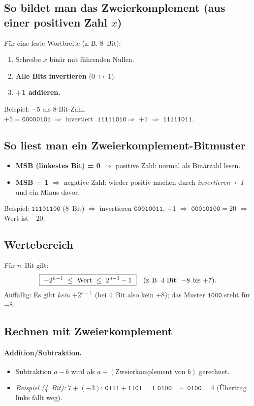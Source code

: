 \documentclass[12pt,a4paper]{book}
\begin{document}
\subsection{So bildet man das Zweierkomplement (aus einer positiven Zahl \(x\))}
Für eine feste Wortbreite (z.\,B. 8~Bit):
\begin{enumerate}
	\item Schreibe \(x\) binär mit führenden Nullen.
	\item \textbf{Alle Bits invertieren} (0\,\(\leftrightarrow\)\,1).
	\item \textbf{+1 addieren.}
\end{enumerate}
Beispiel: \(-5\) als 8-Bit-Zahl. \\
\(+5 = \texttt{00000101}\ \Rightarrow\) invertiert \(\texttt{11111010}\ \Rightarrow\) \(+1\) \(\Rightarrow\) \(\boxed{\texttt{11111011}}\).

\subsection*{So liest man ein Zweierkomplement-Bitmuster}
\begin{itemize}
	\item \textbf{MSB (linkestes Bit) = 0} \(\Rightarrow\) positive Zahl: normal als Binärzahl lesen.
	\item \textbf{MSB = 1} \(\Rightarrow\) negative Zahl: wieder positiv machen durch \emph{invertieren + 1} und ein Minus davor.
\end{itemize}
Beispiel: \(\texttt{11101100}\) (8~Bit) \(\Rightarrow\) invertieren \(\texttt{00010011}\), \(+1\) \(\Rightarrow\) \(\texttt{00010100} = 20\) \(\Rightarrow\) Wert ist \(-20\).

\subsection*{Wertebereich}
Für \(n\)~Bit gilt:
\[
\boxed{\ -2^{n-1}\ \le\ \text{Wert}\ \le\ 2^{n-1}-1\ }\quad
\text{(z.\,B. 4~Bit: \(-8\) bis \(+7\)).}
\]
Auffällig: Es gibt \emph{kein} \(+2^{n-1}\) (bei 4~Bit also kein \(+8\)); das Muster \(\texttt{1000}\) steht für \(-8\).

\subsection*{Rechnen mit Zweierkomplement}
\paragraph{Addition/Subtraktion.}
\begin{itemize}
	\item Subtraktion \(a-b\) wird als \(a + (\text{Zweierkomplement von } b)\) gerechnet.
	\item \emph{Beispiel (4~Bit):} \(7 + (-3)\): \(\texttt{0111} + \texttt{1101} = \texttt{1 0100}\) \(\Rightarrow\) \(\texttt{0100} = 4\) (Übertrag links fällt weg).
\end{itemize}
\end{document}
